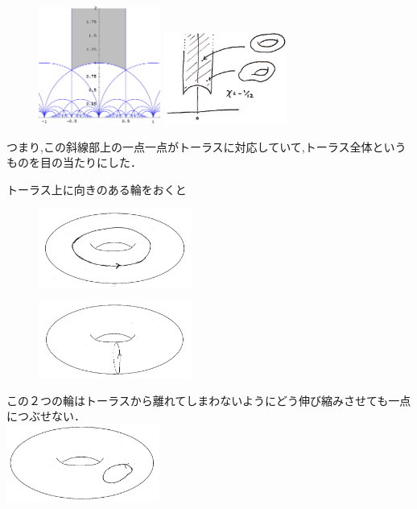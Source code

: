 \begin{figure}[h]
\begin{minipage}{0.5\hsize}
\includegraphics[width=4cm]{asaka8.png}
\end{minipage}
\begin{minipage}{0.5\hsize}
\includegraphics[width=4cm]{asaka9.jpg}
\end{minipage}
\end{figure}

つまり,この斜線部上の一点一点がトーラスに対応していて,トーラス全体というものを目の当たりにした．

トーラス上に向きのある輪をおくと\\
\begin{figure}[h]
\begin{minipage}{0.5\hsize}
\includegraphics[width=5cm]{asaka10.png}\\
\end{minipage}
\begin{minipage}{0.5\hsize}
\includegraphics[width=5cm]{asaka101.png}\\
\end{minipage}
\end{figure}
この２つの輪はトーラスから離れてしまわないようにどう伸び縮みさせても一点につぶせない．\\
\includegraphics[width=5cm]{asaka11.png}

